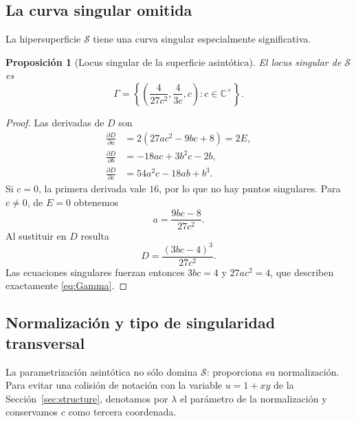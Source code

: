 \documentclass[11pt]{article}
\newtheorem{proposition}[theorem]{Proposici\'on}
\theoremstyle{definition}
\theoremstyle{remark}
\newcommand{\C}{\mathbb{C}}
\begin{document}
\subsection{La curva singular omitida}

La hipersuperficie $\mathcal S$ tiene una curva singular especialmente
significativa.

\begin{proposition}[Locus singular de la superficie asint\'otica]
El locus singular de $\mathcal S$ es
\begin{equation}\label{eq:Gamma}
\Gamma=
\left\{
\left(
\frac{4}{27c^2},\frac{4}{3c},c
\right):c\in\C^\times
\right\}.
\end{equation}
\end{proposition}

\begin{proof}
Las derivadas de $D$ son
\begin{align*}
\frac{\partial D}{\partial a}&=2(27ac^2-9bc+8)=2E,\\
\frac{\partial D}{\partial b}&=-18ac+3b^2c-2b,\\
\frac{\partial D}{\partial c}&=54a^2c-18ab+b^3.
\end{align*}
Si $c=0$, la primera derivada vale $16$, por lo que no hay puntos singulares.
Para $c\neq0$, de $E=0$ obtenemos
\[
a=\frac{9bc-8}{27c^2}.
\]
Al sustituir en $D$ resulta
\[
D=\frac{(3bc-4)^3}{27c^2}.
\]
Las ecuaciones singulares fuerzan entonces $3bc=4$ y
$27ac^2=4$, que describen exactamente \eqref{eq:Gamma}.
\end{proof}

\subsection{Normalizaci\'on y tipo de singularidad transversal}
\label{sec:normalization-cusp}

La parametrizaci\'on asint\'otica no s\'olo domina $\mathcal S$: proporciona
su normalizaci\'on. Para evitar una colisi\'on de notaci\'on con la variable
$u=1+xy$ de la Secci\'on~\ref{sec:structure}, denotamos por $\lambda$ el
par\'ametro de la normalizaci\'on y conservamos $c$ como tercera coordenada.
\end{document}
